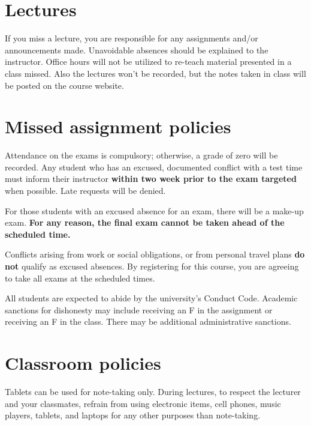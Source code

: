 \documentclass[12pt]{amsart}
\newcommand{\svs}{\vspace{.1cm}}
\begin{document}
\section*{Lectures}
If you miss a lecture, you are responsible for any assignments and/or announcements made. Unavoidable absences should be explained to the instructor. Office hours will not be utilized to re-teach material presented in a class missed. Also the lectures won't be recorded, but the notes taken in class will be posted on the course website.

\section*{Missed assignment policies}

 Attendance on the exams is compulsory; otherwise, a grade of zero will be recorded. Any student who has an excused, documented conflict with a test time must inform their instructor \textbf{within two week prior to the exam targeted} when possible.  Late requests will be denied.

For those students with an excused absence for an exam, there will be a make-up exam. \textbf{For any reason, the final exam cannot be taken ahead of the scheduled time.}

Conflicts arising from work or social obligations, or from personal travel plans \textbf{do not} qualify as excused absences. By registering for this course, you are agreeing to take all exams at the scheduled times.

\svs

All students are expected to abide by the university's Conduct Code. Academic sanctions for dishonesty may include receiving an F in the assignment or receiving an F in the class. There may be additional administrative sanctions.

\section*{Classroom policies}
Tablets can be used for note-taking only. During lectures, to respect the lecturer and your classmates, refrain from using electronic items, cell phones, music players, tablets, and laptops for any other purposes than note-taking.
\end{document}

